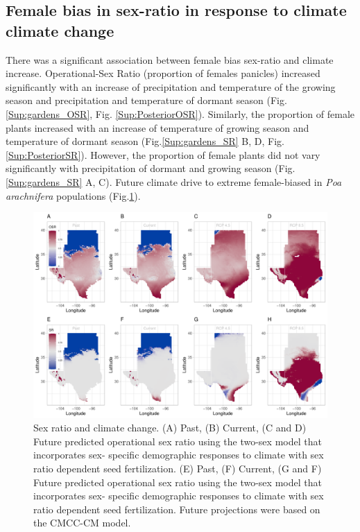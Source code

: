 \documentclass[12pt]{article}
\begin{document}
\subsection*{Female bias in sex-ratio in response to climate climate change}
There was a significant association between female bias sex-ratio and climate increase. 
Operational-Sex Ratio (proportion of females panicles) increased significantly with an increase of precipitation and temperature of the growing season and precipitation and temperature of dormant season (Fig.\ref{Sup:gardens_OSR}, Fig. \ref{Sup:PosteriorOSR}). 
Similarly, the proportion of female plants increased with an increase of temperature of growing season and temperature of dormant season (Fig.\ref{Sup:gardens_SR} B, D, Fig. \ref{Sup:PosteriorSR}).
However, the proportion of female plants did not vary significantly with precipitation of dormant and growing season (Fig.\ref{Sup:gardens_SR} A, C). 
Future climate drive to extreme female-biased in \emph{Poa arachnifera} populations (Fig.\ref{fig:srprojcmc}). 

\begin{figure}[H]
  \begin{center}
    \includegraphics[width=1\linewidth]{Figures/Fig_geo_sr_cmc.pdf}
  \caption{Sex ratio and climate change.
  (A) Past, (B) Current, (C and D) Future predicted operational sex ratio using the two-sex model that incorporates sex- specific demographic responses to climate with sex ratio dependent seed fertilization.
  (E) Past, (F) Current, (G and F) Future predicted operational sex ratio using the two-sex model that incorporates sex- specific demographic responses to climate with sex ratio dependent seed fertilization.
  Future projections were based on the CMCC-CM model.}
  \label{fig:srprojcmc}
  \end{center}
\end{figure}
\end{document}
